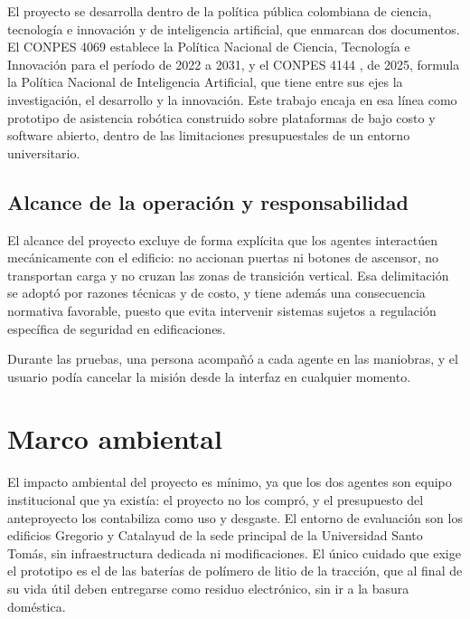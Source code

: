 El proyecto se desarrolla dentro de la política pública colombiana de ciencia, tecnología e innovación y de
inteligencia artificial, que enmarcan dos documentos. El CONPES 4069 \autocite{conpes4069} establece la Política
Nacional de Ciencia, Tecnología e Innovación para el período de 2022 a 2031, y el CONPES 4144
\autocite{conpes4144}, de 2025, formula la Política Nacional de Inteligencia Artificial, que tiene entre sus ejes
la investigación, el desarrollo y la innovación. Este trabajo encaja en esa línea como prototipo de asistencia robótica
construido sobre plataformas de bajo costo y software abierto, dentro de las limitaciones presupuestales de un
entorno universitario.



\subsection{Alcance de la operación y responsabilidad}

El alcance del proyecto excluye de forma explícita que los agentes interactúen mecánicamente con el edificio: no
accionan puertas ni botones de ascensor, no transportan carga y no cruzan las zonas de transición vertical. Esa
delimitación se adoptó por razones técnicas y de costo, y tiene además una consecuencia normativa favorable, puesto
que evita intervenir sistemas sujetos a regulación específica de seguridad en edificaciones.

Durante las pruebas, una persona acompañó a cada agente en las maniobras, y el usuario podía cancelar la misión desde la interfaz en cualquier momento.



\section{Marco ambiental}
\label{sec:ambiental}

El impacto ambiental del proyecto es mínimo, ya que los dos agentes son equipo institucional que ya existía: el
proyecto no los compró, y el presupuesto del anteproyecto los contabiliza como uso y desgaste. El entorno de evaluación
son los edificios Gregorio y Catalayud de la sede principal de la Universidad Santo Tomás, sin infraestructura dedicada ni modificaciones. El único cuidado que exige el
prototipo es el de las baterías de polímero de litio de la tracción, que al final de su vida útil deben entregarse como
residuo electrónico, sin ir a la basura doméstica.
